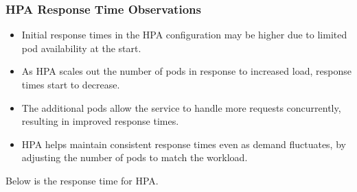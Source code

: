 \subsubsection{HPA Response Time Observations}
\begin{itemize}
    \item Initial response times in the HPA configuration may be higher due to limited pod availability at the start.
    \item As HPA scales out the number of pods in response to increased load, response times start to decrease.
    \item The additional pods allow the service to handle more requests concurrently, resulting in improved response times.
    \item HPA helps maintain consistent response times even as demand fluctuates, by adjusting the number of pods to match the workload.
\end{itemize}

\noindent Below is the response time for HPA.

